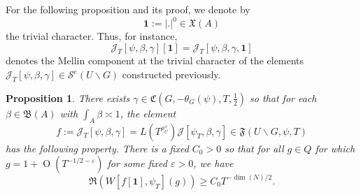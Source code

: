 \documentclass[reqno]{amsart}
\def\eps{\varepsilon}
\def\O{\operatorname{O}}
\theoremstyle{plain} \newtheorem{theorem} {Theorem}
\newtheorem{proposition} [theorem] {Proposition}
\theoremstyle{definition} \newtheorem{definition} [theorem] {Definition}
\theoremstyle{itplain} %
\numberwithin{equation}{section}
\numberwithin{theorem}{section}
\renewcommand{\geq}{\geqslant}
\begin{document}
For the following proposition and its proof, we denote by
\begin{equation*}
  \mathbf{1} := |.|^0 \in \mathfrak{X}(A)
\end{equation*}
the trivial character.  Thus, for instance,
\begin{equation*}
  \mathcal{J}_T[\psi,\beta,\gamma][\mathbf{1}] = 
  \mathcal{J}_T[\psi,\beta,\gamma,\mathbf{1}]
\end{equation*}
denotes the Mellin component at the trivial character of the elements $\mathcal{J}_T[\psi,\beta,\gamma] \in \mathcal{S}^e(U \backslash G)$ constructed previously.
\begin{proposition}\label{prop:there-exists-gamma}
  There exists $\gamma \in \mathfrak{C}(G,-\theta_G(\psi),T,\tfrac{1}{2})$ so that for each $\beta \in \mathfrak{B}(A)$ with $\int_{A} \beta \asymp 1$, the element
  \begin{equation}\label{eq:f-:=-mathcalj_tpsi}
    f := \mathcal{J}_T[\psi,\beta,\gamma] = L (T ^{\rho _U ^\vee }) \mathcal{J}[\psi_T,\beta,\gamma] \in \mathfrak{F}(U \backslash G, \psi, T)
  \end{equation}
has the following property.  There is a fixed $C_0 > 0$ so that for all $g \in Q$ for which $g = 1 + \O(T^{-1/2-\eps})$ for some fixed $\eps > 0$, we have
  \begin{equation}\label{eq:real-part-W-lower-bound}
    \Re(W[f[\mathbf{1}], \psi_T](g)) \geq C_0 T^{-\dim(N)/2}.
  \end{equation}
\end{proposition}
\end{document}

